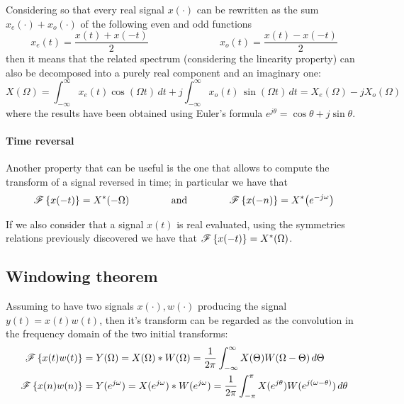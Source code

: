 		Considering so that every real signal $x(\cdot)$ can be rewritten as the sum $x_e(\cdot) + x_o(\cdot)$ of the following even and odd functions
		\[ x_e(t) = \frac{x(t) + x(-t)}{2} \hspace{3cm} x_o(t) = \frac{x(t) - x(-t)}{2} \]
		then it means that the related spectrum (considering the linearity property) can also be decomposed into a purely real component and an imaginary one:
		\[ X(\Omega) = \int_{-\infty}^\infty x_e(t) \cos(\Omega t) \, dt + j \int_{-\infty}^\infty x_o(t)\, \sin(\Omega t)\, dt = X_e(\Omega) - j X_o(\Omega)\]
		where the results have been obtained using Euler's formula $e^{j\theta} = \cos\theta + j \sin\theta$.
		
		\paragraph{Time reversal} Another property that can be useful is the one that allows to compute the transform of a signal reversed in time; in particular we have that
		\begin{equation}
			\mathscr{F}\left\{ x(-t) \right\} = X^*(-\Omega) \hspace{1.5cm} \textrm{and} \hspace{1.5cm} \mathscr{F}\left\{ x(-n) \right\} = X^*\big(e^{-j\omega}\big)
		\end{equation}
		
		\begin{note}
			If we also consider that a signal $x(t)$ is real evaluated, using the symmetries relations previously discovered we have that $\mathscr{F}\left\{ x(-t) \right\} = X^*(\Omega)$.
		\end{note}
	
	\subsection{Windowing theorem} 
		Assuming to have two signals $x(\cdot),w(\cdot)$  producing the signal $y(t) = x(t) w(t)$, then it's transform can be regarded as the convolution in the frequency domain of the two initial transforms:
		\begin{equation} \label{eq:four:windowing}
			\begin{split}
				\mathscr{F}\left\{ x(t)w(t) \right\} & = Y(\Omega) = X(\Omega)*W(\Omega) = \frac 1 {2\pi} \int_{-\infty}^{\infty} X(\Theta) W(\Omega - \Theta)\, d\Theta \\
				\mathscr{F}\left\{ x(n)w(n) \right\} & =  Y(e^{j\omega}) = X(e^{j\omega}) * W(e^{j\omega}) = \frac 1 {2\pi} \int_{-\pi}^\pi X(e^{j\theta}) W(e^{j(\omega-\theta)}) \, d\theta
			\end{split}
		\end{equation}
	
